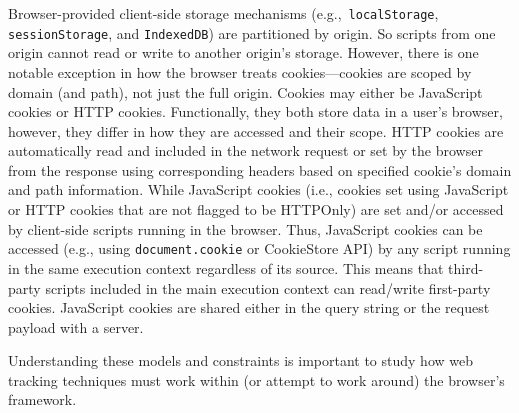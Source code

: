 %
Browser-provided client-side storage mechanisms (e.g.,~\texttt{localStorage}, \texttt{sessionStorage}, and \texttt{IndexedDB}) are partitioned by origin.
%
So scripts from one origin cannot read or write to another origin’s storage. 
%
However, there is one notable exception in how the browser treats cookies---cookies are scoped by domain (and path), not just the full origin. 
%
%
%
Cookies may either be JavaScript cookies or HTTP cookies. 
%
Functionally, they both store data in a user's browser, however, they differ in how they are accessed and their scope.
%
HTTP cookies are automatically read and included in the network request or set by the browser from the response using corresponding headers based on specified cookie's domain and path information.
%
While JavaScript cookies (i.e., cookies set using JavaScript or HTTP cookies that are not flagged to be HTTPOnly) are set and/or accessed by client-side scripts running in the browser. 
%
Thus, JavaScript cookies can be accessed (e.g., using \texttt{document.cookie} or CookieStore API) by any script running in the same execution context regardless of its source. 
%
This means that third-party scripts included in the main execution context can read/write first-party cookies. 
%
JavaScript cookies are shared either in the query string or the request payload with a server.
%


Understanding these models and constraints is important to study how web tracking techniques must work within (or attempt to work around) the browser’s framework.